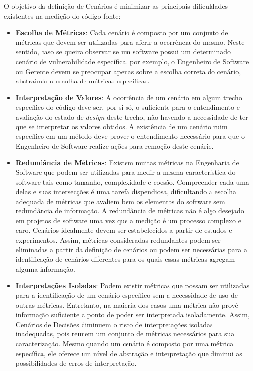%

O objetivo da definição de Cenários é minimizar as principais dificuldades existentes na medição do código-fonte:

%

\begin{itemize}
\item \textbf{Escolha de Métricas}: Cada cenário é composto por um conjunto de métricas que devem ser utilizadas para aferir a ocorrência do mesmo. Neste sentido, caso se queira observar se um software possui um determinado cenário de vulnerabilidade específica, por exemplo, o Engenheiro de Software ou Gerente devem se preocupar apenas sobre a escolha correta do cenário, abstraindo a escolha de métricas específicas.
\item \textbf{Interpretação de Valores}: A ocorrência de um cenário em algum trecho específico do código deve ser, por si só, o suficiente para o entendimento e avaliação do estado de \emph{design} deste trecho, não havendo a necessidade de ter que se interpretar os valores obtidos. A existência de um cenário ruim específico em um  método deve prover o entendimento necessário para que o Engenheiro de Software realize ações para remoção deste cenário.
\item \textbf{Redundância de Métricas}: Existem muitas métricas na Engenharia de Software que podem ser utilizadas para medir a mesma característica do software tais como tamanho, complexidade e coesão. Compreender cada uma delas e suas intersecções é uma tarefa dispendiosa, dificultando a escolha adequada de métricas que avaliem bem os elementos do software sem redundância de informação. A redundância de métricas não é algo desejado em projetos de software uma vez que a medição é um processo complexo e caro. Cenários idealmente devem ser estabelecidos a partir de estudos e experimentos. Assim, métricas consideradas redundantes podem ser eliminadas a partir da definição de cenários ou podem ser necessárias para a identificação de cenários diferentes para os quais essas métricas agregam alguma informação.
\item \textbf{Interpretações Isoladas}: Podem existir métricas que possam ser utilizadas para a identificação de um cenário específico sem a necessidade de uso de outras métricas. Entretanto, na maioria dos casos uma métrica não provê informação suficiente a ponto de poder ser interpretada isoladamente. Assim, Cenários de Decisões diminuem o risco de interpretações isoladas inadequadas, pois reunem um conjunto de métricas necessários para sua caracterização. Mesmo quando um cenário é composto por uma métrica específica, ele oferece um nível de abstração e interpretação que diminui as possibilidades de erros de interpretação.

\end{itemize}

